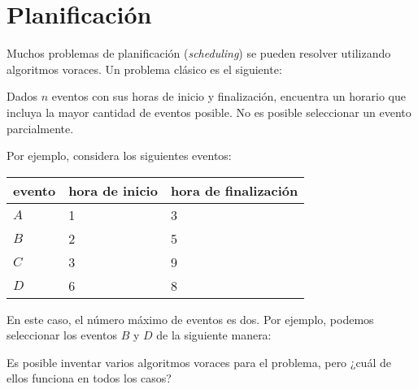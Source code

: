 \section{Planificación}

Muchos problemas de planificación (\textit{scheduling})
se pueden resolver utilizando algoritmos voraces.
Un problema clásico es el siguiente:

\begin{framed}
    \noindent Dados $n$ eventos con sus horas de inicio y finalización,
    encuentra un horario que incluya la mayor cantidad de eventos posible.
    No es posible seleccionar un evento parcialmente.
\end{framed}

\newpage
Por ejemplo, considera los siguientes eventos:
\begin{center}
    \begin{tabular}{lll}
        evento & hora de inicio & hora de finalización \\
        \hline
        $A$    & 1              & 3                    \\
        $B$    & 2              & 5                    \\
        $C$    & 3              & 9                    \\
        $D$    & 6              & 8                    \\
    \end{tabular}
\end{center}
En este caso, el número máximo de eventos es dos.
Por ejemplo, podemos seleccionar los eventos $B$ y $D$
de la siguiente manera:
\begin{center}
\end{center}

Es posible inventar varios algoritmos voraces
para el problema, pero ¿cuál de ellos funciona en todos los casos?

